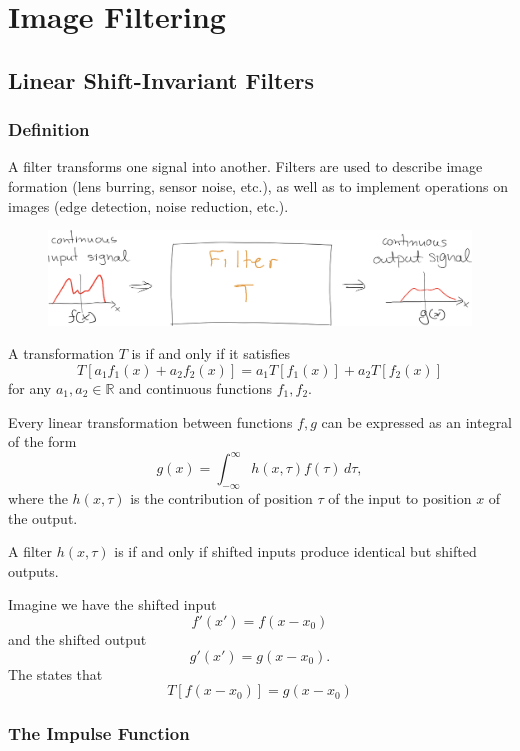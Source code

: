 \chapter{Image Filtering}

\section{Linear Shift-Invariant Filters}

\subsection{Definition}

A filter transforms one signal into another. Filters are used to describe image formation (lens burring, sensor noise, etc.), as well as to implement operations on images (edge detection, noise reduction, etc.).

\begin{figure}[ht!]
    \centering
    \includegraphics[width=0.75\linewidth]{figures/filter.png}
\end{figure}

\begin{definition}\label{def:linear-transformation}
    A transformation $T$ is  if and only if it satisfies \[
        T[a_1 f_1(x) + a_2 f_2(x)] = a_1 T[f_1(x)] + a_2 T[f_2(x)]
    \] for any $a_1, a_2 \in \mathbb{R}$ and continuous functions $f_1, f_2$. 
\end{definition}

Every linear transformation between functions $f, g$ can be expressed as an integral of the form \[
    g(x) = \int_{-\infty}^{\infty} h(x, \tau) f(\tau) \, d\tau,
\] where the $h(x, \tau)$ is the contribution of position $\tau$ of the input to position $x$ of the output.


\begin{definition}\label{def:shift-invariant-filter}
    A filter $h(x, \tau)$ is  if and only if shifted inputs produce identical but shifted outputs. 
\end{definition}


Imagine we have the shifted input \[
    f'(x') = f(x - x_0)
\] and the shifted output \[
    g'(x') = g(x - x_0).
\] The  states that \[
    T[f(x - x_0)] = g(x - x_0)
\]

\subsection{The Impulse Function}
